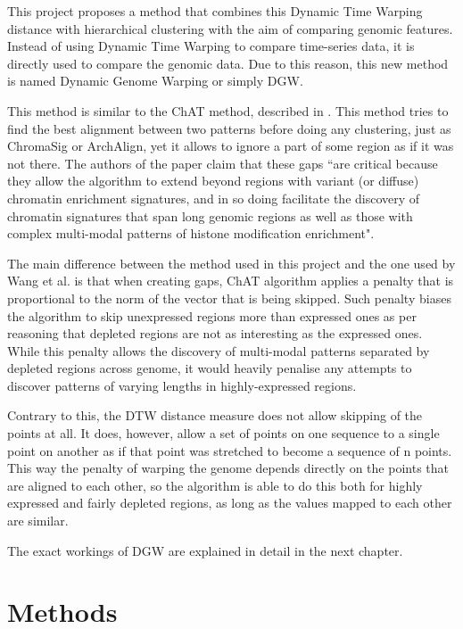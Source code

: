 \documentclass[parskip]{cs4rep}
\begin{document}
This project proposes a method that combines this Dynamic Time Warping distance with hierarchical clustering with the aim of comparing genomic features. Instead of using Dynamic Time Warping to compare time-series data, it is directly used to compare the genomic data. Due to this reason, this new method is named Dynamic Genome Warping or simply DGW.

This method is similar to the ChAT method, described in \citep{Wang:2012cb}.
This method tries to find the best alignment between two patterns before doing any clustering, just as ChromaSig or ArchAlign, yet it allows to ignore a part of some region as if it was not there. The authors of the paper claim that these gaps ``are critical because they allow the algorithm to extend beyond regions with variant (or diffuse) chromatin enrichment signatures, and in so doing facilitate the discovery of chromatin signatures that span long genomic regions as well as those with complex multi-modal patterns of histone modification enrichment". 

The main difference between the method used in this project and the one used by Wang et al. is that when creating gaps, ChAT algorithm applies a penalty that is proportional to the norm of the vector that is being skipped. Such penalty biases the algorithm to skip unexpressed regions more than expressed ones as per reasoning that depleted regions are not as interesting as the expressed ones. 
While this penalty allows the discovery of multi-modal patterns separated by depleted regions across genome, it would heavily penalise any attempts to discover patterns of varying lengths in highly-expressed regions.

Contrary to this, the DTW distance measure does not allow skipping of the points at all. It does, however, allow a set of points on one sequence to a single point on another as if that point was stretched to become a sequence of n points. This way the penalty of warping the genome depends directly on the points that are aligned to each other, so the algorithm is able to do this both for highly expressed and fairly depleted regions, as long as the values mapped to each other are similar.

The exact workings of DGW are explained in detail in the next chapter.

\chapter{Methods}
\label{cha:methods}
\end{document}
